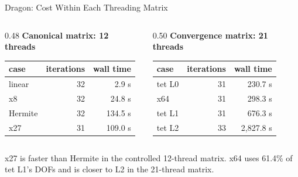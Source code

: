 \documentclass[aspectratio=169,10pt]{beamer}
\begin{document}
\begin{frame}{Dragon: Cost Within Each Threading Matrix}
  \scriptsize
  \begin{columns}[T]
    \begin{column}{0.48\linewidth}
      \textbf{Canonical matrix: 12 threads}
      \begin{table}
        \centering
        \begin{tabular}{lrr}
          \toprule
          case & iterations & wall time \\
          \midrule
          linear & 32 & 2.9 s \\
          x8 & 32 & 24.8 s \\
          Hermite & 32 & 134.5 s \\
          x27 & 31 & 109.0 s \\
          \bottomrule
        \end{tabular}
      \end{table}
    \end{column}
    \begin{column}{0.50\linewidth}
      \textbf{Convergence matrix: 21 threads}
      \begin{table}
        \centering
        \begin{tabular}{lrr}
          \toprule
          case & iterations & wall time \\
          \midrule
          tet L0 & 31 & 230.7 s \\
          x64 & 31 & 298.3 s \\
          tet L1 & 31 & 676.3 s \\
          tet L2 & 33 & 2,827.8 s \\
          \bottomrule
        \end{tabular}
      \end{table}
    \end{column}
  \end{columns}

  \vspace{0.5em}
  x27 is faster than Hermite in the controlled 12-thread matrix. x64 uses
  61.4\% of tet L1's DOFs and is closer to L2 in the 21-thread matrix.
\end{frame}
\end{document}
